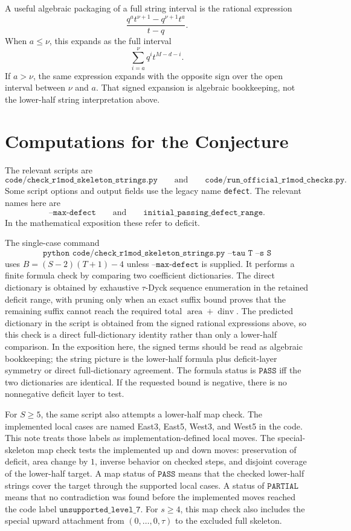 \documentclass{article}
\newcommand{\dinv}{\operatorname{dinv}}
\newcommand{\area}{\operatorname{area}}
\begin{document}
A useful algebraic packaging of a full string interval is the rational
expression
\[
  \frac{q^a t^{\nu+1}-q^{\nu+1}t^a}{t-q}.
\]
When \(a\le\nu\), this expands as the full interval
\[
  \sum_{i=a}^{\nu}q^i t^{M-d-i}.
\]
If \(a>\nu\), the same expression expands with the opposite sign over the open
interval between \(\nu\) and \(a\).  That signed expansion is algebraic
bookkeeping, not the lower-half string interpretation above.

\section{Computations for the Conjecture}

The relevant scripts are
\[
  \texttt{code/check\_r1mod\_skeleton\_strings.py}
  \qquad\text{and}\qquad
  \texttt{code/run\_official\_r1mod\_checks.py}.
\]
Some script options and output fields use the legacy name \texttt{defect}.  The
relevant names here are
\[
  \texttt{--max-defect}
  \qquad\text{and}\qquad
  \texttt{initial\_passing\_defect\_range}.
\]
In the mathematical exposition these refer to deficit.

The single-case command
\[
  \texttt{python code/check\_r1mod\_skeleton\_strings.py --tau T --s S}
\]
uses \(B=(S-2)(T+1)-4\) unless \(\texttt{--max-defect}\) is supplied.  It
performs a finite formula check by comparing two coefficient dictionaries.  The
direct dictionary is obtained by exhaustive \(\tau\)-Dyck sequence enumeration in the
retained deficit range, with pruning only when an exact suffix bound proves that
the remaining suffix cannot reach the required total \(\area+\dinv\).  The
predicted dictionary in the script is obtained from the signed rational
expressions above, so this check is a direct full-dictionary identity rather
than only a lower-half comparison.  In the exposition here, the signed terms
should be read as algebraic bookkeeping; the string picture is the lower-half
formula plus deficit-layer symmetry or direct full-dictionary agreement.  The
formula status is \(\texttt{PASS}\) iff the two dictionaries are identical.  If
the requested bound is negative, there is no nonnegative deficit layer to test.

For \(S\ge5\), the same script also attempts a lower-half map check.  The
implemented local cases are named East3, East5, West3, and West5 in the code.
This note treats those labels as implementation-defined local moves.  The
special-skeleton map check tests the implemented up and down moves:
preservation of deficit, area change by \(1\), inverse behavior on checked
steps, and disjoint coverage of the lower-half target.  A map status of
\(\texttt{PASS}\) means that the checked lower-half strings cover the target
through the supported local cases.  A status of \(\texttt{PARTIAL}\) means
that no contradiction was found before the implemented moves reached the code
label \(\texttt{unsupported\_level\_7}\).  For \(s\ge4\), this map check also
includes the special upward attachment from \((0,\ldots,0,\tau)\) to the
excluded full skeleton.
\end{document}
